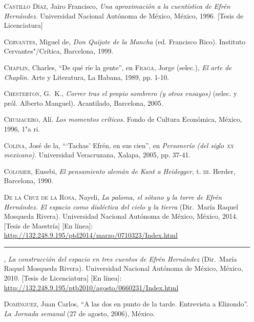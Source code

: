 \documentclass[14pt,twoside,final]{extbook} %
\begin{document}
\textsc{Castillo Díaz}, Jairo Francisco, \emph{Una aproximación a la cuentística de Efrén Hernández.} Universidad Nacional Autónoma de México, México, 1996. [Tesis de Licenciatura]\label{bib:castillo1996}

\textsc{Cervantes}, Miguel de, \emph{Don Quijote de la Mancha} (ed. Francisco Rico). Instituto Cervantes"/Crítica, Barcelona, 1999.\label{bib:cervantes1999}

\textsc{Chaplin}, Charles, ``De qué ríe la gente'', en \textsc{Fraga}, Jorge (selec.), \emph{El arte de Chaplin.} Arte y Literatura, La Habana, 1989, pp. 1-10.\label{bib:chaplin1989}

\textsc{Chesterton}, G.~K., \emph{Correr tras el propio sombrero (y otros ensayos)} (selec. y pról. Alberto Manguel). Acantilado, Barcelona, 2005.\label{bib:chesterton2005}

\textsc{Chumacero}, Alí. \emph{Los momentos críticos.} Fondo de Cultura Económica, México, 1996, 1"a ri.

\textsc{Colina}, José de la, ``{}`Tachas' Efrén, en sus cien'', en \emph{Personerío (del siglo \textsc{xx} mexicano).} Universidad Veracruzana, Xalapa, 2005, pp. 37-41.\label{bib:colina2005}

\textsc{Colomer}, Eusebi, \emph{El pensamiento alemán de Kant a Heidegger,} t. \textsc{iii}. Herder, Barcelona, 1990.\label{bib:colomer1990}

\textsc{De la Cruz de la Rosa}, Nayeli, \textit{\emph{La paloma, el sótano y la torre} de Efrén Hernández. El espacio como dialéctica del cielo y la tierra} (Dir.~María Raquel Mosqueda Rivera). Universidad Nacional Autónoma de México, México, 2014. [Tesis de Maestría] [En línea]: \url{http://132.248.9.195/ptd2014/marzo/0710323/Index.html}\label{bib:delacruz2014}

\rule{1cm}{0.4pt}, \emph{La construcción del espacio en tres cuentos de Efrén Hernández} (Dir.~María Raquel Mosqueda Rivera). Universidad Nacional Autónoma de México, México, 2010. [Tesis de Licenciatura] [En línea]: \url{http://132.248.9.195/ptb2010/agosto/0660231/Index.html}\label{bib:delacruz2010}

\textsc{Domínguez}, Juan Carlos, ``A las dos en punto de la tarde. Entrevista a Elizondo''. \emph{La Jornada semanal} (27 de agosto, 2006), México.\label{bib:dominguez2006}
\end{document}
